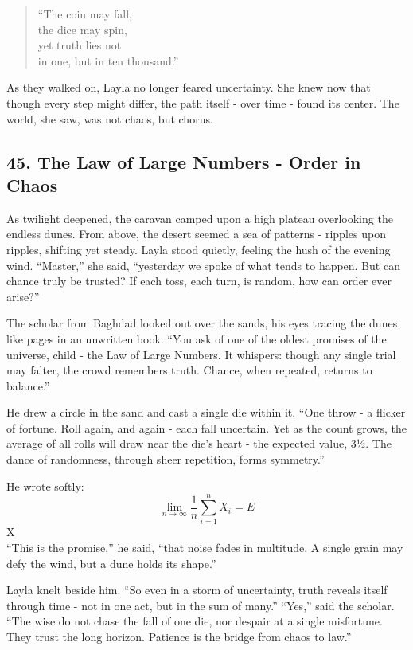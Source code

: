\documentclass[
  letterpaper,
  DIV=11,
  numbers=noendperiod]{scrreprt}
\begin{document}
\begin{quote}
``The coin may fall,\\
the dice may spin,\\
yet truth lies not\\
in one, but in ten thousand.''
\end{quote}

As they walked on, Layla no longer feared uncertainty. She knew now that
though every step might differ, the path itself - over time - found its
center. The world, she saw, was not chaos, but chorus.

\subsection{45. The Law of Large Numbers - Order in
Chaos}\label{the-law-of-large-numbers---order-in-chaos}

As twilight deepened, the caravan camped upon a high plateau overlooking
the endless dunes. From above, the desert seemed a sea of patterns -
ripples upon ripples, shifting yet steady. Layla stood quietly, feeling
the hush of the evening wind. ``Master,'' she said, ``yesterday we spoke
of what tends to happen. But can chance truly be trusted? If each toss,
each turn, is random, how can order ever arise?''

The scholar from Baghdad looked out over the sands, his eyes tracing the
dunes like pages in an unwritten book. ``You ask of one of the oldest
promises of the universe, child - the Law of Large Numbers. It whispers:
though any single trial may falter, the crowd remembers truth. Chance,
when repeated, returns to balance.''

He drew a circle in the sand and cast a single die within it. ``One
throw - a flicker of fortune. Roll again, and again - each fall
uncertain. Yet as the count grows, the average of all rolls will draw
near the die's heart - the expected value, 3½. The dance of randomness,
through sheer repetition, forms symmetry.''

He wrote softly: \[
\lim_{n \to \infty} \frac{1}{n} \sum_{i=1}^n X_i = E\]X\[
\] ``This is the promise,'' he said, ``that noise fades in multitude. A
single grain may defy the wind, but a dune holds its shape.''

Layla knelt beside him. ``So even in a storm of uncertainty, truth
reveals itself through time - not in one act, but in the sum of many.''
``Yes,'' said the scholar. ``The wise do not chase the fall of one die,
nor despair at a single misfortune. They trust the long horizon.
Patience is the bridge from chaos to law.''
\end{document}
